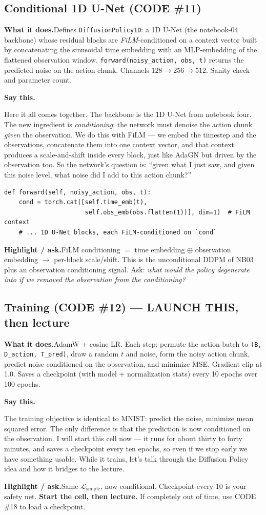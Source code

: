 \documentclass[11pt]{article}
\newenvironment{saythis}{%
  \par\smallskip\noindent
  \begin{list}{}{%
    \setlength{\leftmargin}{1.2em}%
    \setlength{\rightmargin}{0.5em}%
    \setlength{\topsep}{2pt}%
  }\item\relax
  \color{sayrule}\textbf{Say this.}\hspace{0.4em}\color{black}\itshape
}{%
  \end{list}\par\smallskip
}
\newcommand{\highlight}[1]{\par\smallskip\noindent\textcolor{hlcolor}{\textbf{Highlight / ask.}}\hspace{0.4em}#1\par\smallskip}
\newcommand{\whatdoes}[1]{\par\noindent\textbf{What it does.}\hspace{0.4em}#1\par}
\begin{document}
\subsection{Conditional 1D U-Net (CODE \#11)}
\whatdoes{Defines \texttt{DiffusionPolicy1D}: a 1D U-Net (the notebook-04 backbone) whose residual blocks
are \emph{FiLM}-conditioned on a context vector built by concatenating the sinusoidal time embedding with
an MLP-embedding of the flattened observation window. \texttt{forward(noisy\_action, obs, t)} returns the
predicted noise on the action chunk. Channels $128\to256\to512$. Sanity check and parameter count.}
\begin{saythis}
Here it all comes together. The backbone is the 1D U-Net from notebook four. The new ingredient is
\emph{conditioning}: the network must denoise the action chunk \emph{given} the observation. We do this
with FiLM --- we embed the timestep and the observations, concatenate them into one context vector, and
that context produces a scale-and-shift inside every block, just like AdaGN but driven by the
observation too. So the network's question is: ``given what I just saw, and given this noise level, what
noise did I add to this action chunk?''
\end{saythis}
\begin{lstlisting}
def forward(self, noisy_action, obs, t):
    cond = torch.cat([self.time_emb(t),
                      self.obs_emb(obs.flatten(1))], dim=1)  # FiLM context
    # ... 1D U-Net blocks, each FiLM-conditioned on `cond`
\end{lstlisting}
\highlight{FiLM conditioning $=$ time embedding $\oplus$ observation embedding $\to$ per-block
scale/shift. This is the unconditional DDPM of NB03 plus an observation conditioning signal. Ask:
\emph{what would the policy degenerate into if we removed the observation from the conditioning?}}

\subsection{Training (CODE \#12) --- LAUNCH THIS, then lecture}
\whatdoes{AdamW + cosine LR. Each step: permute the action batch to \texttt{(B, D\_action, T\_pred)}, draw
a random $t$ and noise, form the noisy action chunk, predict noise conditioned on the observation, and
minimize MSE. Gradient clip at 1.0. Saves a checkpoint (with model + normalization stats) every 10
epochs over 100 epochs.}
\begin{saythis}
The training objective is identical to MNIST: predict the noise, minimize mean squared error. The only
difference is that the prediction is now conditioned on the observation. I will start this cell now ---
it runs for about thirty to forty minutes, and saves a checkpoint every ten epochs, so even if we stop
early we have something usable. While it trains, let's talk through the Diffusion Policy idea and how it
bridges to the lecture.
\end{saythis}
\highlight{Same $\mathcal{L}_{\text{simple}}$, now conditional. Checkpoint-every-10 is your safety net.
\textbf{Start the cell, then lecture.} If completely out of time, use CODE \#18 to load a checkpoint.}
\end{document}
